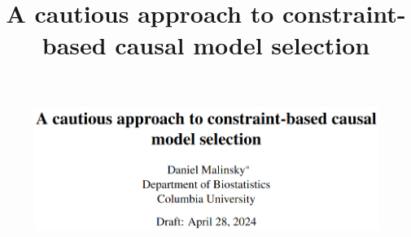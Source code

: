 \documentclass{beamer}
\begin{document}
\title[]{A cautious approach to constraint-based causal model selection}
\date{}

\begin{frame}
	\begin{figure}
		\includegraphics[scale=0.3]{imgs/title.png}
	\end{figure}
\end{frame}
\end{document}
